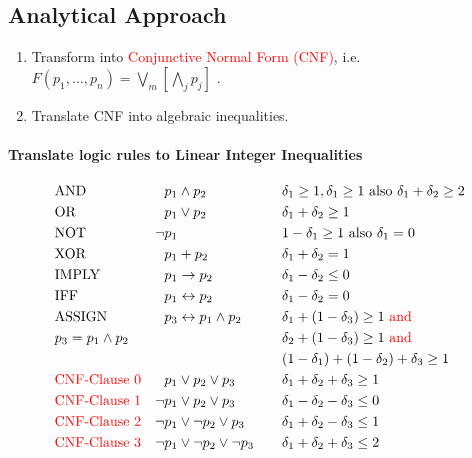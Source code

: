 \documentclass[landscape,a4paper,8pt]{scrartcl}
\newcommand{\remph}[1]{{\textcolor{red}{#1}}}
\begin{document}
\begin{multicols*}{3}
\subsection{Analytical Approach}
\begin{enumerate}
\item Transform into \remph{Conjunctive Normal Form (CNF)}, i.e.  $F(p_1, \dots, p_n) = \bigvee_m\left[\bigwedge_j p_j\right]$ .
\item Translate CNF into algebraic inequalities.
\end{enumerate}

\paragraph{Translate logic rules to Linear Integer Inequalities}
\begin{align*}
&\text{AND}    & p_1 &\wedge p_2 \quad          &&\delta_1 \geq 1, \delta_1 \geq 1\text{ also } \delta_1 + \delta_2 \geq 2 \\
&\text{OR}     & p_1 &\vee p_2 \quad            &&\delta_1 + \delta_2 \geq 1 \\
&\text{NOT}    & \neg p_1 &\quad                &&1-\delta_1 \geq 1 \text{ also } \delta_1 = 0 \\
&\text{XOR}    & p_1 &+ p_2 \quad               &&\delta_1 + \delta_2 = 1 \\
&\text{IMPLY}  & p_1 &\rightarrow p_2 \quad     &&\delta_1 - \delta_2 \leq 0 \\
&\text{IFF}    & p_1 &\leftrightarrow p_2 \quad &&\delta_1 - \delta_2 = 0 \\
&\text{ASSIGN}         & p_3 &\leftrightarrow p_1 \wedge p_2 \quad && \delta_1 + (1 - \delta_3) \geq 1 \remph{\text{ and}} \\
& p_3 = p_1 \wedge p_2 &     &                          &&\delta_2 + (1 - \delta_3) \geq 1 \remph{\text{ and}} \\
&                      &     &                          &&(1 - \delta_1) + (1 - \delta_2) + \delta_3 \geq 1 \\
&\remph{\text{CNF-Clause 0}} &      p_1 &\vee p_2 \vee p_3 \quad           && \delta_1 + \delta_2 + \delta_3 \geq 1 \\
&\remph{\text{CNF-Clause 1}} & \neg p_1 &\vee p_2 \vee p_3 \quad           && \delta_1 - \delta_2 - \delta_3 \leq 0 \\
&\remph{\text{CNF-Clause 2}} & \neg p_1 &\vee \neg p_2 \vee p_3 \quad      && \delta_1 + \delta_2 - \delta_3 \leq 1 \\
&\remph{\text{CNF-Clause 3}} & \neg p_1 &\vee \neg p_2 \vee \neg p_3 \quad && \delta_1 + \delta_2 + \delta_3 \leq 2
\end{align*}

\end{multicols*}
\end{document}
